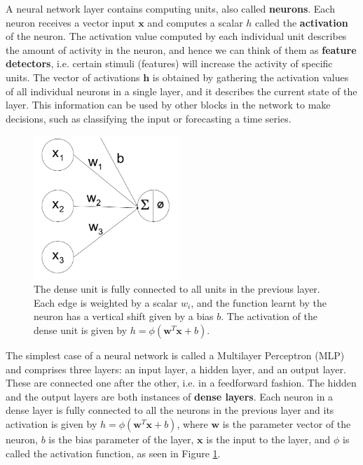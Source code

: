 \documentclass[pdftex,11pt,a4paper]{article}
\theoremstyle{definition}
\theoremstyle{remark}
\newcommand*{\V}[1]{\mathbf{#1}}%
\begin{document}
\par A neural network layer contains computing units, also called \textbf{neurons}. Each neuron receives a vector input $\V{x}$ and computes a scalar $h$ called the \textbf{activation} of the neuron. The activation value computed by each individual unit describes the amount of activity in the neuron, and hence we can think of them as \textbf{feature detectors}, i.e. certain stimuli (features) will increase the activity of specific units. The vector of activations $\V{h}$ is obtained by gathering the activation values of all individual neurons in a single layer, and it describes the current state of the layer. This information can be used by other blocks in the network to make decisions, such as classifying the input or forecasting a time series.

\begin{figure}[t]
    \centering
    \includegraphics[width=5.5cm]{figs/neuron.png}
    \caption{The dense unit is fully connected to all units in the previous layer. Each edge is weighted by a scalar $w_i$, and the function learnt by the neuron has a vertical shift given by a bias $b$. The activation of the dense unit is given by $h = \phi(\V{w}^T\V{x} + b )$.}
    \label{fig:neuron} 
\end{figure} 

\par The simplest case of a neural network is called a Multilayer Perceptron (MLP) and comprises three layers: an input layer, a hidden layer, and an output layer. These are connected one after the other, i.e. in a feedforward fashion. The hidden and the output layers are both instances of \textbf{dense layers}. Each neuron in a dense layer is fully connected to all the neurons in the previous layer and its activation is given by $h = \phi(\V{w}^T\V{x} + b)$, where $\V{w}$ is the parameter vector of the neuron, $b$ is the bias parameter of the layer, $\V{x}$ is the input to the layer, and $\phi$ is called the activation function, as seen in Figure \ref{fig:neuron}.
\end{document}
